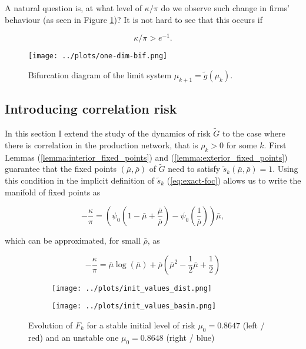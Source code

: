 \documentclass[../../main.tex]{subfiles}
\begin{document}
A natural question is, at what level of $\kappa / \pi$ do we observe such change in firms' behaviour (as seen in Figure \ref{fig:one-dimensional-bifurcation})? It is not hard to see that this occurs if 

\begin{equation}
  \kappa / \pi > e^{-1}.
\end{equation}


\begin{figure}[H]
  \centering
  \texttt{[image: ../plots/one-dim-bif.png]}
  \caption{Bifurcation diagram of the limit system $\mu_{k + 1} = \tilde{g}(\mu_k)$.}
  \label{fig:one-dimensional-bifurcation}
\end{figure}

\subsection{Introducing correlation risk}

In this section I extend the study of the dynamics of risk $\tilde{G}$ to the case where there is correlation in the production network, that is $\rho_k > 0$ for some $k$. First Lemmas (\ref{lemma:interior_fixed_points}) and (\ref{lemma:exterior_fixed_points}) guarantee that the fixed points $(\bar{\mu}, \bar{\rho})$ of $\tilde{G}$ need to satisfy $\tilde{s}_k(\bar{\mu}, \bar{\rho})= 1$. Using this condition in the implicit definition of $\tilde{s}_k$ (\ref{eq:exact-foc}) allows us to write the manifold of fixed points as

\begin{equation}
  -\frac{\kappa}{\pi} = \left( \psi_0\left(1 - \bar{\mu} + \frac{ \bar{\mu} }{\bar{\rho}} \right) - \psi_0\left(\frac{1}{\bar{\rho}} \right) \right) \bar{\mu},
\end{equation}

which can be approximated, for small $\bar{\rho}$, as

\begin{equation}
  -\frac{\kappa}{\pi} = \bar{\mu}\log(\bar{\mu}) + \bar{\rho} \left( \bar{\mu}^2 - \frac{1}{2} \bar{\mu} + \frac{1}{2} \right)
\end{equation}

\begin{figure}[htp]
  \begin{subfigure}{\textwidth}
    \centering
    \texttt{[image: ../plots/init\_values\_dist.png]}
  \end{subfigure}
  
  \bigskip
  \centering
  \begin{subfigure}{0.5\textwidth}
    \centering
    \texttt{[image: ../plots/init\_values\_basin.png]} 
  \end{subfigure}

  \caption{Evolution of $F_k$ for a stable initial level of risk $\mu_0 = 0.8647$ (left / red) and an unstable one $\mu_0 = 0.8648$ (right / blue)}  
  \label{fig:small-init}
\end{figure}
\end{document}
